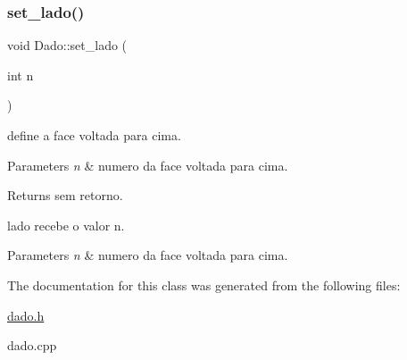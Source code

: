 \subsubsection{\texorpdfstring{set\+\_\+lado()}{set\_lado()}}
{\footnotesize\ttfamily void Dado\+::set\+\_\+lado (\begin{DoxyParamCaption}\item[{int}]{n }\end{DoxyParamCaption})}



define a face voltada para cima. 


\begin{DoxyParams}{Parameters}
{\em n} & numero da face voltada para cima. \\
\hline
\end{DoxyParams}
\begin{DoxyReturn}{Returns}
sem retorno.
\end{DoxyReturn}
lado recebe o valor n. 
\begin{DoxyParams}{Parameters}
{\em n} & numero da face voltada para cima. \\
\hline
\end{DoxyParams}


The documentation for this class was generated from the following files\+:\begin{DoxyCompactItemize}
\item 
\mbox{\hyperlink{dado_8h}{dado.\+h}}\item 
dado.\+cpp\end{DoxyCompactItemize}
